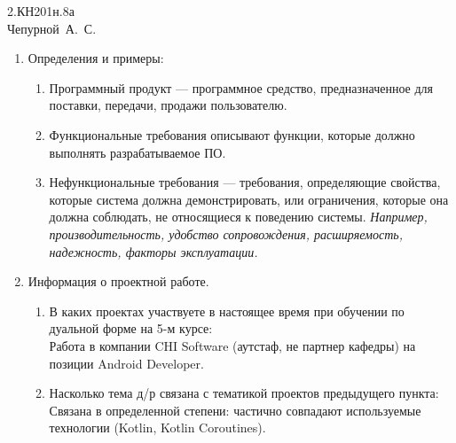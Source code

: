 \documentclass[a4paper,14pt,oneside,final]{extarticle}
\begin{document}
\Russian

\begin{flushright}
2.КН201н.8а \\[0.4em]
{\large Чепурной~А.~С.} \\[0.8em]
\end{flushright}

\begin{enumerate}
    \item Определения и примеры:
    \begin{enumerate}
        \item Программный продукт --- программное средство, предназначенное для поставки, передачи, продажи пользователю.
        \item Функциональные требования описывают функции, которые должно выполнять разрабатываемое ПО.
        \item Нефункциональные требования --- требования, определяющие свойства, которые система должна демонстрировать, или ограничения, которые она должна соблюдать, не относящиеся к поведению системы. \textit{Например, производительность, удобство сопровождения, расширяемость, надежность, факторы эксплуатации.}
    \end{enumerate}
    \item Информация о проектной работе.
    \begin{enumerate}
        \item В каких проектах участвуете в настоящее время при обучении по дуальной форме на 5-м курсе: \\
        Работа в компании CHI Software (аутстаф, не партнер кафедры) на позиции Android Developer.
        \item Насколько тема д/р связана с тематикой проектов предыдущего пункта: \\
        Связана в определенной степени: частично совпадают используемые технологии (Kotlin, Kotlin Coroutines). 
    \end{enumerate}
\end{enumerate}
\end{document}
